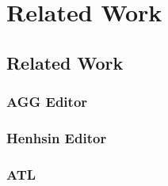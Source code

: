 
\chapter{Related Work} %

\label{Chapter5} %


\section{Related Work}

\subsection{AGG Editor}

\subsection{Henhsin Editor}

\subsection{ATL}

